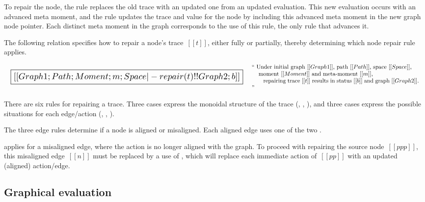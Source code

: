 \documentclass[11pt]{article}
\begin{document}
To repair the node, the rule replaces the old trace with an updated one
from an updated evaluation.
%
This new evaluation occurs with an advanced meta moment, and the rule
updates the trace and value for the node by including this advanced
meta moment in the new graph node pointer.
%
Each distinct meta moment in the graph corresponds to the use of this
rule, the only rule that advances it.


The following relation specifies how to repair a node's trace~$[[t]]$, either fully or partially,
thereby determining which node repair rule applies.

\[
\begin{array}{lc}
  {\scalebox{1.5}{
  \boxed{[[Graph1; Path; Moment; m; Space |- repair(t) !! Graph2; b]]}}}
&
\begin{array}{p{4in}}
  ``
  Under initial graph~$[[Graph1]]$,
  path~$[[Path]]$,
  space~$[[Space]]$,\\
  \hspace{3mm}~moment~$[[Moment]]$ and meta-moment~$[[m]]$,\\
  \hspace{6mm}~repairing trace~$[[t]]$
  results in status~$[[b]]$ and graph~$[[Graph2]]$.
  ''
\end{array}
\end{array}
\]

\begin{mathpar}
\end{mathpar}

There are six rules for repairing a trace.
%
Three cases express the monoidal structure of the
trace (, , ), and
three cases express the possible situations for each edge/action
(, ,
).

The three edge rules determine if a node is aligned or misaligned.
%
Each aligned edge uses one of the
two .

 applies for a misaligned edge, where the action
is no longer aligned with the graph.
%
To proceed with repairing the source node~$[[ppp]]$, this misaligned edge~$[[n]]$ must be
replaced by a use of , which will replace each
immediate action of~$[[pp]]$ with an updated (aligned) action/edge.

\subsection{Graphical evaluation}
\end{document}

